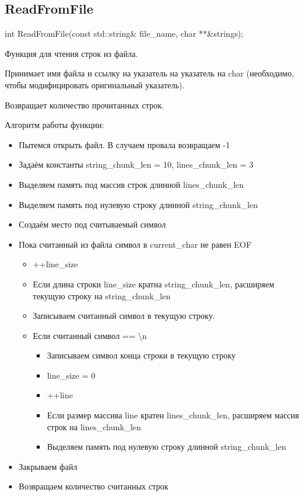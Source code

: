\subsection*{ReadFromFile}
int ReadFromFile(const std::string\& file\_name, char **\&strings);

Функция для чтения строк из файла. 

Принимает имя файла и ссылку на указатель на указатель на char (необходимо, чтобы модифицировать оригинальный указатель). 

Возвращает количество прочитанных строк.

Алгоритм работы функции:

\begin{itemize}
	\item Пытемся открыть файл. В случаем провала возвращаем -1
	\item Задаём константы string\_chunk\_len = 10, lines\_chunk\_len = 3
	\item Выделяем память под массив строк длинной lines\_chunk\_len
	\item Выделяем память под нулевую строку длинной string\_chunk\_len
	\item Создаём место под считываемый символ
	\item Пока считанный из файла символ в current\_char не равен EOF
	\begin{itemize}
		\item ++line\_size
		\item Если длина строки line\_size кратна string\_chunk\_len, расширяем текущую строку на string\_chunk\_len
		\item Записываем считанный символ в текущую строку.
		\item Если считанный символ == \textbackslash n
		\begin{itemize}
			\item Записываем символ конца строки в текущую строку
			\item line\_size = 0
			\item ++line
			\item Если размер массива line кратен lines\_chunk\_len, расширяем массив строк на lines\_chunk\_len
			\item Выделяем память под нулевую строку длинной string\_chunk\_len
		\end{itemize}
	\end{itemize}
	\item Закрываем файл
	\item Возвращаем количество считанных строк
\end{itemize}

